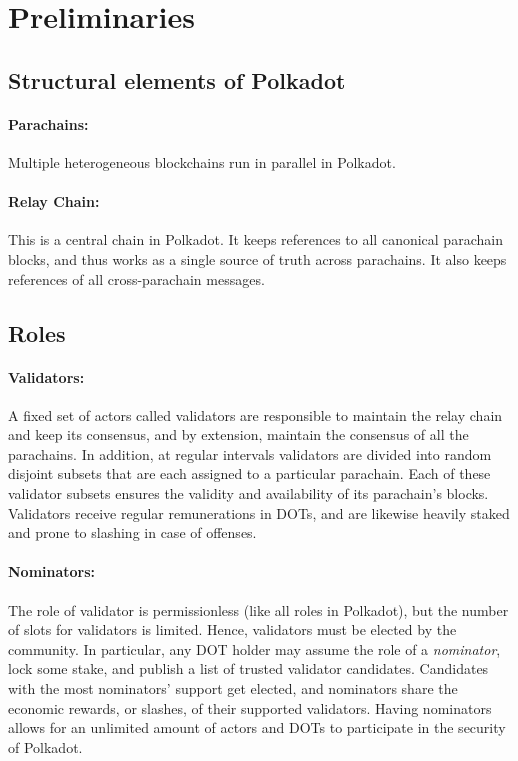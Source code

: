 \section{Preliminaries}

\subsection{Structural elements of Polkadot}

\paragraph{Parachains:} Multiple heterogeneous blockchains run in parallel in Polkadot. 

\paragraph{Relay Chain:} This is a central chain in Polkadot. It keeps references 
to all canonical parachain blocks, and thus works as a single source of truth across parachains. 
It also keeps references of all cross-parachain messages.

\subsection{Roles}

\paragraph{Validators:} A fixed set of actors called validators are responsible to maintain the relay chain 
and keep its consensus, and by extension, maintain the consensus of all the parachains. 
In addition, at regular intervals validators are divided into random disjoint subsets 
that are each assigned to a particular parachain. 
Each of these validator subsets ensures the validity and availability of its parachain's blocks. 
Validators receive regular remunerations in DOTs, 
and are likewise heavily staked and prone to slashing in case of offenses.

\paragraph{Nominators:} The role of validator is permissionless (like all roles in Polkadot), 
but the number of slots for validators is limited. Hence, validators must be elected by the community. 
In particular, any DOT holder may assume the role of a \emph{nominator}, lock some stake, and publish a list 
of trusted validator candidates. Candidates with the most nominators' support get elected, 
and nominators share the economic rewards, or slashes, of their supported validators. 
Having nominators allows for an unlimited amount of actors and DOTs to participate in the security of Polkadot.


